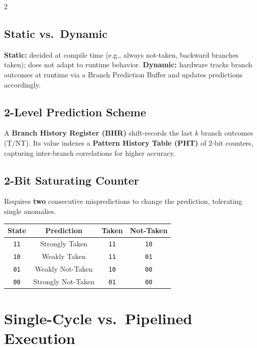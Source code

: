 \documentclass[9pt]{article}
\begin{document}
\begin{multicols}{2}

\subsection{Static vs.\ Dynamic}
\textbf{Static:} decided at compile time (e.g., always not-taken, backward branches taken); does not adapt to runtime behavior.
\textbf{Dynamic:} hardware tracks branch outcomes at runtime via a Branch Prediction Buffer and updates predictions accordingly.

\subsection{2-Level Prediction Scheme}
A \textbf{Branch History Register (BHR)} shift-records the last $k$ branch outcomes (T/NT). Its value indexes a \textbf{Pattern History Table (PHT)} of 2-bit counters, capturing inter-branch correlations for higher accuracy.

\columnbreak

\subsection{2-Bit Saturating Counter}
Requires \textbf{two} consecutive mispredictions to change the prediction, tolerating single anomalies.

\vspace{3pt}
\begin{tabular}{@{}cccc@{}}
  \toprule
  \textbf{State} & \textbf{Prediction} & \textbf{Taken} & \textbf{Not-Taken} \\
  \midrule
  \texttt{11} & Strongly Taken     & \texttt{11} & \texttt{10} \\
  \texttt{10} & Weakly Taken       & \texttt{11} & \texttt{01} \\
  \texttt{01} & Weakly Not-Taken   & \texttt{10} & \texttt{00} \\
  \texttt{00} & Strongly Not-Taken & \texttt{01} & \texttt{00} \\
  \bottomrule
\end{tabular}

\end{multicols}

\section{Single-Cycle vs.\ Pipelined Execution}
\end{document}
